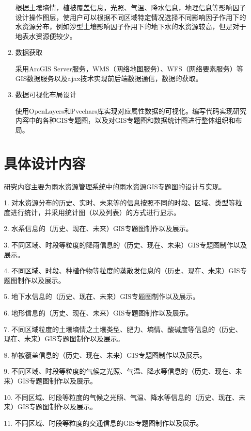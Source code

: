 \begin{enumerate}
根据土壤墒情，植被覆盖信息，光照、气温、降水信息，地理信息等影响因子设计操作图层，使用户可以根据不同区域特定情况选择不同影响因子作用下的水资源分布，例如沙型土壤影响因子作用下的地下水的水资源较高，但是对于地表水资源便较少。

\item 	数据获取

采用ArcGIS Server服务，WMS（网络地图服务）、WFS（网络要素服务）等GIS数据服务以及ajax技术实现前后端数据通信，数据的获取。
\item 	数据可视化布局设计

使用OpenLayers和Pvechars库实现对应属性数据的可视化。编写代码实现研究内容中的各种GIS专题图，以及对GIS专题图和数据统计图进行整体组织和布局。
\end{enumerate}
\section{具体设计内容}

研究内容主要为雨水资源管理系统中的雨水资源GIS专题图的设计与实现。


1.	对水资源分布的历史、实时、未来等的信息按照不同的时段、区域、类型等粒度进行统计，并采用统计图（以及列表）的方式进行显示。


2.	水系信息的（历史、现在、未来）GIS专题图制作以及展示。

3.	不同区域、时段等粒度的降雨信息的（历史、现在、未来）GIS专题图制作以及展示。


4.	不同区域、时段、种植作物等粒度的蒸散发信息的（历史、现在、未来）GIS专题图制作以及展示。


5.	地下水信息的（历史、现在、未来）GIS专题图制作以及展示。


6.	地形信息的（历史、现在、未来）GIS专题图制作以及展示。

7.	不同区域粒度的土壤墒情之土壤类型、肥力、墒情、酸碱度等信息的（历史、现在、未来）GIS专题图制作以及展示。

8.	植被覆盖信息的（历史、现在、未来）GIS专题图制作以及展示。

9.	不同区域、时段等粒度的气候之光照、气温、降水等信息的（历史、现在、未来）GIS专题图制作以及展示。

10.	不同区域、时段等粒度的气候之光照、气温、降水等信息的（历史、现在、未来）GIS专题图制作以及展示。

11.	不同区域、时段等粒度的交通信息的GIS专题图制作以及展示。



